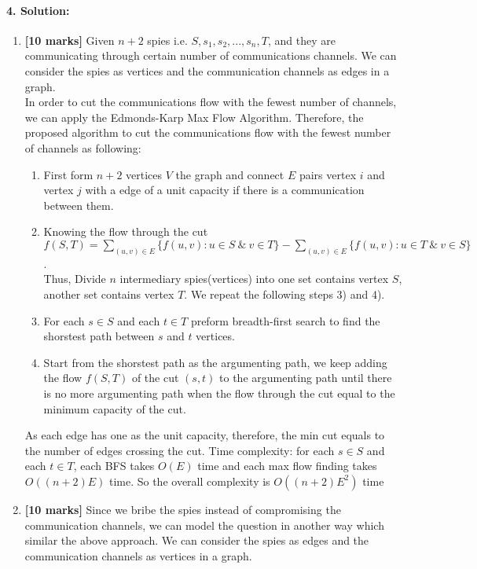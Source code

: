 \documentclass[a4paper]{scrartcl}
\begin{document}
\paragraph{4. Solution:}
\label{sec:Question 4}
\begin{enumerate}[label=(\alph{*})]
  \item {\bfseries[10 marks]} Given $ n + 2 $ spies i.e. $ S, s_1, s_2, ... , s_n, T$, and they are communicating through certain number of communications channels. We can consider the spies as vertices and the communication channels as edges in a graph.\\
  In order to cut the communications flow with the fewest number of channels, we can apply the Edmonds-Karp Max Flow Algorithm. Therefore, the proposed algorithm to cut the communications flow with the fewest number of channels as following:
  \begin{enumerate}[label=\arabic{*})]
    \item First form $n+2$ vertices $V$ the graph and connect $E$ pairs vertex $i$ and vertex $j$ with a edge of a unit capacity if there is a communication between them. 
    \item Knowing the flow through the cut $f(S,T)=\sum_{(u,v) \in E} \{ f(u,v): u \in S\ \&\ v \in T \} - \sum_{(u,v) \in E} \{ f(u,v): u \in T\ \&\ v \in S\}$.\\
    Thus, Divide $n$ intermediary spies(vertices) into one set contains vertex $S$, another set contains vertex $T$. We repeat the following steps 3) and 4).
    \item For each $s \in S$ and each $t \in T$ preform breadth-first search to find the shorstest path between $s$ and $t$ vertices.
    \item Start from the shorstest path as the argumenting path, we keep adding the flow $f(S,T)$ of the cut $(s,t)$ to the argumenting path until there is no more argumenting path when the flow through the cut equal to the minimum capacity of the cut.
  \end{enumerate}
  As each edge has one as the unit capacity, therefore, the min cut equals to the number of edges crossing the cut.
  Time complexity: for each $s \in S$ and each $t \in T$, each BFS takes $O(E)$ time and each max flow finding takes $O((n+2)E)$ time. So the overall complexity is $O((n+2)E^2)$ time
  \item {\bfseries[10 marks]} Since we bribe the spies instead of compromising the communication channels, we can model the question in another way which similar the above approach. We can consider the spies as edges and the communication channels as vertices in a graph.\\

\end{enumerate}
\end{document}
